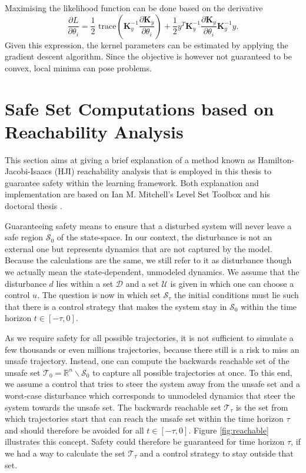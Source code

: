 \documentclass[../main.tex]{subfiles}
\begin{document}
Maximising the likelihood function can be done based on the derivative
\begin{equation}
    \frac{\partial L}{\partial \theta_i} = \dfrac{1}{2} \text{ trace} \left( \mathbf{K}_y^{-1} \frac{\partial \mathbf{K}_y}{\partial \theta_i} \right) + \frac{1}{2}y^T\mathbf{K}_y^{-1} \frac{\partial \mathbf{K}_y}{\partial \theta_i} \mathbf{K}_y^{-1} y.
\end{equation}
Given this expression, the kernel parameters can be estimated by applying the gradient descent algorithm. Since the objective is however not guaranteed to be convex, local minima can pose problems.


\section{Safe Set Computations based on Reachability Analysis}\label{sec:SafeSets}
This section aims at giving a brief explanation of a method known as Hamilton-Jacobi-Isaacs (HJI) reachability analysis that is employed in this thesis to guarantee safety within the learning framework. Both explanation and implementation are based on Ian M. Mitchell's Level Set Toolbox \cite{mitchell2004toolbox} and his doctoral thesis \cite{mitchell2003application}.

Guaranteeing safety means to ensure that a disturbed system will never leave a safe region $\mathcal{S}_0$ of the state-space. In our context, the disturbance is not an external one but represents dynamics that are not captured by the model. Because the calculations are the same, we still refer to it as disturbance though we actually mean the state-dependent, unmodeled dynamics. We assume that the disturbance $d$ lies within a set $\mathcal{D}$ and a set $\mathcal{U}$ is given in which one can choose a control $u$. The question is now in which set $\mathcal{S}_\tau$ the initial conditions must lie such that there is a control strategy that makes the system stay in $\mathcal{S}_0$ within the time horizon $t \in [-\tau,0]$. 

As we require safety for all possible trajectories, it is not sufficient to simulate a few thousands or even millions trajectories, because there still is a risk to miss an unsafe trajectory. Instead, one can compute the backwards reachable set of the unsafe set $\mathcal{T}_0 = \mathbb{R}^n\backslash \mathcal{S}_0$ to capture all possible trajectories at once. To this end, we assume a control that tries to steer the system away from the unsafe set and a worst-case disturbance which corresponds to unmodeled dynamics that steer the system towards the unsafe set. The backwards reachable set $\mathcal{T}_\tau$ is the set from which trajectories start that can reach the unsafe set within the time horizon $\tau$ and should therefore be avoided for all $t \in [-\tau,0]$. Figure \ref{fig:reachable} illustrates this concept. Safety could therefore be guaranteed for time horizon $\tau$, if we had a way to calculate the set $\mathcal{T}_\tau$ and a control strategy to stay outside that set. 
\end{document}
